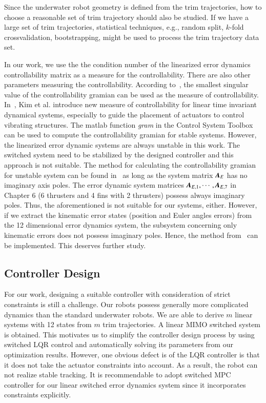 Since the underwater robot geometry is defined from the trim trajectories, how to choose a reasonable set of trim trajectory should also be studied. If we have a large set of trim trajectories, statistical techniques, e.g., random split, $k$-fold crossvalidation, bootstrapping, might be used to process the trim trajectory data set.

In our work, we use the the condition number of the linearized error dynamics controllability matrix as a measure for the controllability. There are also other parameters measuring the controllability. According to~\cite{Moore1981}, the smallest singular value of the controllability gramian can be used as the measure of controllability. In~\cite{JUNKINS1991}, Kim et al. introduce new measure of controllability for linear time invariant dynamical systems, especially to guide the placement of actuators to control vibrating structures. The matlab function \textit{gram} in the Control System Toolbox can be used to compute the controllability gramian for stable systems. However, the linearized error dynamic systems are always unstable in this work. The switched system need to be stabilized by the designed controller and this approach is not suitable. The method for calculating the controllability gramian  for unstable system can be found in~\cite{Nagar2004,Zhou1999} as long as the system matrix $\emph{\textbf{A}}_{E}$ has no imaginary axis poles. The error dynamic system matrices $\emph{\textbf{A}}_{E,1}, \cdots, \emph{\textbf{A}}_{E,7}$ in Chapter 6 (6 thrusters and 4 fins with 2 thrusters) possess always imaginary poles. Thus, the aforementioned is not suitable for our systems, either. However, if we extract the kinematic error states (position and Euler angles errors)  from the 12 dimensional error dynamics system, the subsystem concerning only kinematic errors does not possess imaginary poles. Hence, the method from~\cite{Nagar2004,Zhou1999}  can be implemented. This deserves further study.

\subsection{Controller Design}
For our work, designing a suitable controller with consideration of strict constraints is still a challenge. Our robots possess generally more complicated dynamics than the standard underwater robots. We are able to derive $m$ linear systems with 12 states from $m$ trim trajectories. A linear MIMO switched system is obtained. This motivates us to simplify the controller design process by using switched LQR control and automatically solving its parameters from our optimization results. However, one obvious defect is of the LQR controller is that it does not take the actuator constraints into account. As a result, the robot can  not realize stable tracking. It is recommendable to adopt switched MPC controller for our linear switched error dynamics system since it incorporates constraints explicitly.
